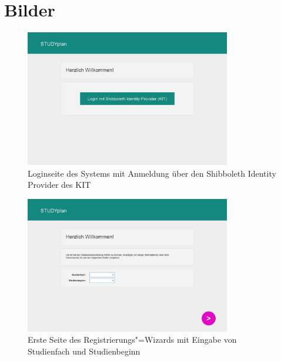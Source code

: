 \newpage
\FloatBarrier
\section{Bilder}
\begin{figure}[!h]
	\caption{Loginseite des Systems mit Anmeldung über den \gls{Shibboleth Identity Provider} des \gls{KIT}}
	\label{fig:gui-login-1}
	\centering
	\includegraphics[width=0.8\textwidth]{../GUI/ergebnisse/login-1.png}
\end{figure}
\begin{figure}[!h]
	\caption{Erste Seite des Registrierungs"=\gls{Wizard}s mit Eingabe von Studienfach und Studienbeginn}
	\label{fig:gui-registrierung-1}
	\centering
	\includegraphics[width=0.8\textwidth]{../GUI/ergebnisse/registrierung-1.png}
\end{figure}

